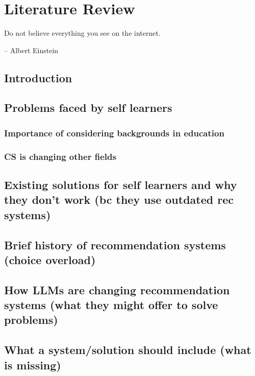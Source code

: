 \chapter{Literature Review} \label{chap:chap-2}

\epigraph{Do not believe everything you see on the internet.}{-- Albert Einstein}



    


\section{Introduction}

\section{Problems faced by self learners} 

\subsection{Importance of considering backgrounds in education} 

\subsection{CS is changing other fields} 

\section{Existing solutions for self learners and why they don’t work (bc they use outdated rec systems)} 

\section{Brief history of recommendation systems (choice overload)} 

\section{How LLMs are changing recommendation systems (what they might offer to solve problems)} 

\section{What a system/solution should include (what is missing)} 
